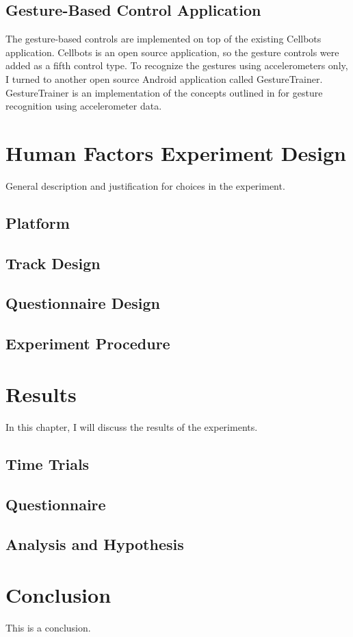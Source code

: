 \documentclass[12pt,a4paper]{report}
\begin{document}
\section{Gesture-Based Control Application}
The gesture-based controls are implemented on top of the existing Cellbots application. Cellbots is an open source application, so the gesture controls were added as a fifth control type. 
To recognize the gestures using accelerometers only, I turned to another open source Android application called GestureTrainer. GestureTrainer is an implementation of the concepts outlined in \cite{TaKG} for gesture recognition using accelerometer data.

\chapter{Human Factors Experiment Design}
General description and justification for choices in the experiment.
\section{Platform}
\section{Track Design}
\section{Questionnaire Design}
\section{Experiment Procedure}

\chapter{Results}
In this chapter, I will discuss the results of the experiments. 
\section{Time Trials}
\section{Questionnaire}
\section{Analysis and Hypothesis}

\chapter{Conclusion}
This is a conclusion.



\end{document}
